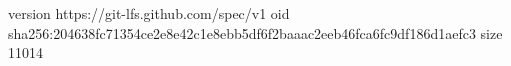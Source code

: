 version https://git-lfs.github.com/spec/v1
oid sha256:204638fc71354ce2e8e42c1e8ebb5df6f2baaac2eeb46fca6fc9df186d1aefc3
size 11014
